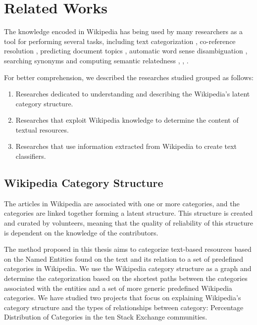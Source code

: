 \chapter{\hspace*{3pt} Related Works}
\label{chapter:related-works}


The knowledge encoded in Wikipedia has being used by many researchers as a tool for performing several tasks, including text categorization \cite{Gabrilovich:2006}, co-reference resolution \cite{strube2006wikirelate}, predicting document topics \cite{schonhofen2009identifying}, automatic word sense disambiguation \cite{mihalcea2007using}, searching synonyms \cite{krizhanovsky2006synonym} and computing semantic relatedness 
\cite{ponzetto2006exploiting}, \cite{gabrilovich2007computing}, \cite{milne2007computing}.

For better comprehension, we described the researches studied grouped as follows: 

\begin{enumerate}
\item Researches dedicated to understanding and describing the Wikipedia’s latent category structure.
\item Researches that exploit  Wikipedia knowledge to determine the content of textual resources.
\item Researches that use information extracted from Wikipedia to create text classifiers.
\end{enumerate}


\section{\hspace*{3pt}Wikipedia Category Structure}

The articles in Wikipedia are associated with one or more categories, and the categories are linked together forming a latent structure. This structure is created and curated by volunteers, meaning that the quality of reliability of this structure is dependent on the knowledge of the contributors.

The method proposed in this thesis aims to categorize text-based resources based on the Named Entities found on the text and its relation to a set of predefined categories in Wikipedia. We use the Wikipedia category structure as a graph and determine the categorization based on the shortest paths between the categories associated with the entities and a set of more generic predefined Wikipedia categories. We have studied two projects that focus on explaining Wikipedia’s category structure and the types of relationships between category: Percentage Distribution of Categories in the ten Stack Exchange communities.


